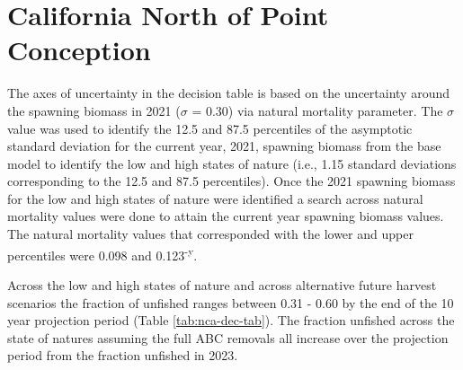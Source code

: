 \documentclass[11pt,
  english,
  a4paper,
]{article}
\begin{document}
\leavevmode\tagmcend\tagstructend\par



\clearpage


\hypertarget{california-north-of-point-conception}{%
\section{California North of Point Conception}\label{california-north-of-point-conception}}

\leavevmode\tagmcend\tagstructend


The axes of uncertainty in the decision table is based on the uncertainty around the spawning biomass in 2021 ({\(\sigma\)\leavevmode\tagmcend\tagstructend} = 0.30) via natural mortality parameter. The {\(\sigma\)\leavevmode\tagmcend\tagstructend} value was used to identify the 12.5 and 87.5 percentiles of the asymptotic standard deviation for the current year, 2021, spawning biomass from the base model to identify the low and high states of nature (i.e., 1.15 standard deviations corresponding to the 12.5 and 87.5 percentiles). Once the 2021 spawning biomass for the low and high states of nature were identified a search across natural mortality values were done to attain the current year spawning biomass values. The natural mortality values that corresponded with the lower and upper percentiles were 0.098 and 0.123\textsuperscript{-y}.

\leavevmode\tagmcend\tagstructend\par


Across the low and high states of nature and across alternative future harvest scenarios the fraction of unfished ranges between 0.31 - 0.60 by the end of the 10 year projection period (Table \ref{tab:nca-dec-tab}). The fraction unfished across the state of natures assuming the full ABC removals all increase over the projection period from the fraction unfished in 2023.

\leavevmode\tagmcend\tagstructend\par


\end{document}
